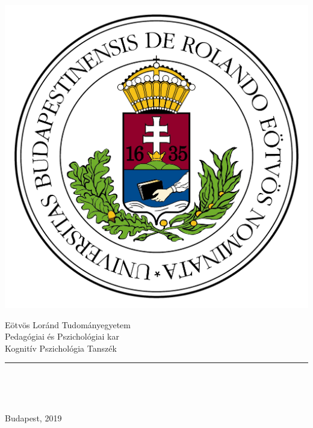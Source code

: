 \begin{titlepage}

\begin{minipage}{0.40\linewidth}
\includegraphics[scale=0.3]{images/elte_logo}
\end{minipage}
\begin{minipage}{0.50\linewidth}
\begin{center}
Eötvös Loránd Tudományegyetem \\
Pedagógiai és Pszichológiai kar \\
Kognitív Pszichológia Tanszék
\end{center}
\end{minipage}

\hrule
 \vfill

\begin{center}
\Huge
\textbf{\Title}
\normalsize
\end{center}

\begin{center}
	\Large
	\textbf{\SubTitle}
	\normalsize
\end{center}

\vfill

\begin{minipage}[t]{0.45\linewidth}
\begin{flushleft}
\textbf{\SupervisorName} \\
\SupervisorTitle
\end{flushleft}
\end{minipage}
\begin{minipage}[t]{0.5\linewidth}
\begin{flushright}
\textbf{\Author} \\
\AuthortTitle
\end{flushright}
\end{minipage}

\vfill

\begin{center}
Budapest, 2019
\end{center}

\end{titlepage}
